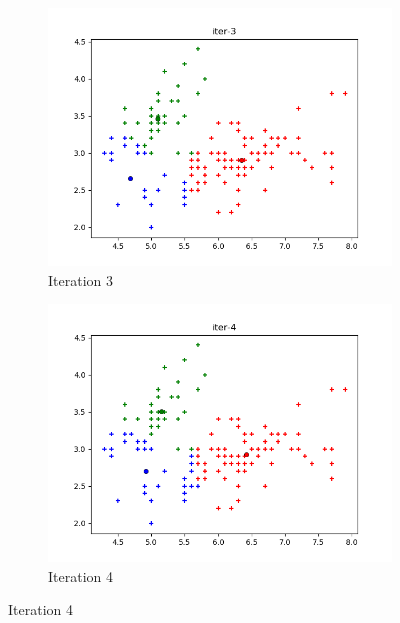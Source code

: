 \documentclass[french]{article}
\begin{document}
\begin{figure}[h!]
\centering
\begin{subfigure}{.5\textwidth}
  \centering
  \includegraphics[width=\linewidth]{img/iter-3.png}
  \caption{Iteration 3}
\end{subfigure}%
\begin{subfigure}{.5\textwidth}
  \centering
  \includegraphics[width=\linewidth]{img/iter-4.png}
  \caption{Iteration 4}
\end{subfigure}%
\end{figure}
\end{document}
